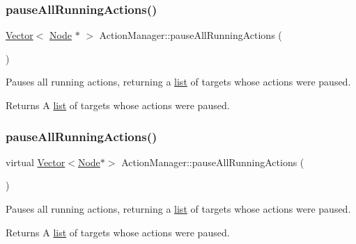 \subsubsection{\texorpdfstring{pause\+All\+Running\+Actions()}{pauseAllRunningActions()}\hspace{0.1cm}{\footnotesize\ttfamily [1/2]}}
{\footnotesize\ttfamily \hyperlink{classVector}{Vector}$<$ \hyperlink{classNode}{Node} $\ast$ $>$ Action\+Manager\+::pause\+All\+Running\+Actions (\begin{DoxyParamCaption}{ }\end{DoxyParamCaption})}

Pauses all running actions, returning a \hyperlink{protocollist-p}{list} of targets whose actions were paused.

\begin{DoxyReturn}{Returns}
A \hyperlink{protocollist-p}{list} of targets whose actions were paused. 
\end{DoxyReturn}
\mbox{\label{classActionManager_a8414ff0c928dbf4cc41fef501215fe24}} 
\subsubsection{\texorpdfstring{pause\+All\+Running\+Actions()}{pauseAllRunningActions()}\hspace{0.1cm}{\footnotesize\ttfamily [2/2]}}
{\footnotesize\ttfamily virtual \hyperlink{classVector}{Vector}$<$\hyperlink{classNode}{Node}$\ast$$>$ Action\+Manager\+::pause\+All\+Running\+Actions (\begin{DoxyParamCaption}{ }\end{DoxyParamCaption})\hspace{0.3cm}{\ttfamily [virtual]}}

Pauses all running actions, returning a \hyperlink{protocollist-p}{list} of targets whose actions were paused.

\begin{DoxyReturn}{Returns}
A \hyperlink{protocollist-p}{list} of targets whose actions were paused. 
\end{DoxyReturn}
\mbox{\label{classActionManager_a321523c8720cd7e8a973d959e5fdebf9}} 
